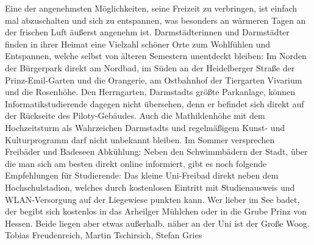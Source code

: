 {Eine der angenehmsten Möglichkeiten, seine Freizeit zu verbringen, ist einfach mal abzuschalten und sich zu entspannen, was besonders an wärmeren Tagen an der frischen Luft äußerst angenehm ist.
}{
    Darmstädterinnen und Darmstädter finden in ihrer Heimat eine Vielzahl schöner Orte zum Wohlfühlen und Entspannen, welche selbst von älteren Semestern unentdeckt bleiben: Im Norden der Bürgerpark direkt am Nordbad, im Süden an der Heidelberger Straße der Prinz-Emil-Garten und die Orangerie, am Ostbahnhof der Tiergarten Vivarium und die Rosenhöhe.
    Den Herrngarten, Darmstadts größte Parkanlage, können Informatikstudierende dagegen nicht übersehen, denn er befindet sich direkt auf der Rückseite des Piloty-Gebäudes. Auch die Mathildenhöhe mit dem Hochzeitsturm als Wahrzeichen Darmstadts und regelmäßigem Kunst- und Kulturprogramm darf nicht unbekannt bleiben.
    Im Sommer versprechen Freibäder und Badeseen Abkühlung: Neben den Schwimmbädern der Stadt, über die man sich am besten direkt online informiert, gibt es noch folgende Empfehlungen für Studierende: Das kleine Uni-Freibad direkt neben dem Hochschulstadion, welches durch kostenlosen Eintritt mit Studienausweis und WLAN-Versorgung auf der Liegewiese punkten kann.
    Wer lieber im See badet, der begibt sich kostenlos in das Arheilger Mühlchen oder in die Grube Prinz von Hessen. Beide liegen aber etwas außerhalb, näher an der Uni ist der Große Woog.
}
{Tobias Freudenreich, Martin Tschirsich, Stefan Gries}
\newpage
